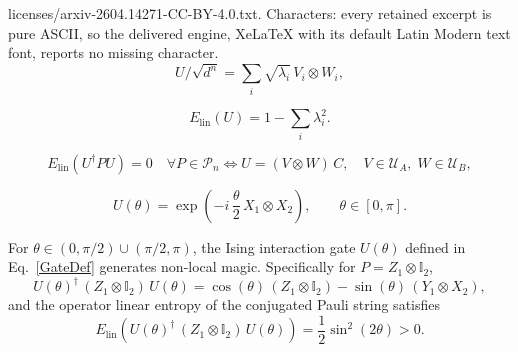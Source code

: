 \documentclass[10pt,a4paper]{amsart}
\begin{document}
licenses/arxiv-2604.14271-CC-BY-4.0.txt. Characters: every retained excerpt is pure ASCII, so the delivered engine, XeLaTeX with its default Latin Modern text font, reports no missing character.
\begin{equation}\label{OpSchmidtDecomp}
    U/\sqrt{d^n} = \sum_i \sqrt{\lambda_i}\, V_i \otimes W_i, 
\end{equation}

\begin{equation}\label{ELimReduction}
    E_{\mathrm{lin}}(U) = 1 - \sum_i \lambda_i^2.  
\end{equation}

\begin{equation}\label{NonLocalMagicCriterion}
E_{\mathrm{lin}}\left(U^\dagger P U \right) = 0 \quad \forall P \in \mathcal{P}_n \iff U = (V \otimes W)\,C, \quad V \in \mathcal{U}_A,\; W \in \mathcal{U}_B,
\end{equation}

\begin{equation}\label{GateDef}
U(\theta) = \exp\left(-i\,\frac{\theta}{2}\,X_1\otimes X_2\right), \qquad \theta \in [0,\pi].
\end{equation}

\begin{proposition}\label{prop:nonlocal}
For $\theta \in (0,\pi/2)\cup(\pi/2,\pi)$, the Ising interaction gate $U(\theta)$ defined in Eq.\ \eqref{GateDef} generates non-local magic. Specifically for $P = Z_1\otimes\mathbb{I}_2$,
%
\begin{equation}\label{ConjugationResult}
U(\theta)^\dagger\,(Z_1\otimes\mathbb{I}_2)\,U(\theta) = \cos(\theta)\,(Z_1\otimes\mathbb{I}_2) - \sin(\theta)\,(Y_1\otimes X_2),
\end{equation}
%
and the operator linear entropy of the conjugated Pauli string satisfies
%
\begin{equation}\label{ElinResult}
E_{\mathrm{lin}}\left(U(\theta)^\dagger\,(Z_1\otimes\mathbb{I}_2)\,U(\theta)\right) = \frac{1}{2}\sin^2(2\theta) > 0.
\end{equation}
%
\end{proposition}
\end{document}
